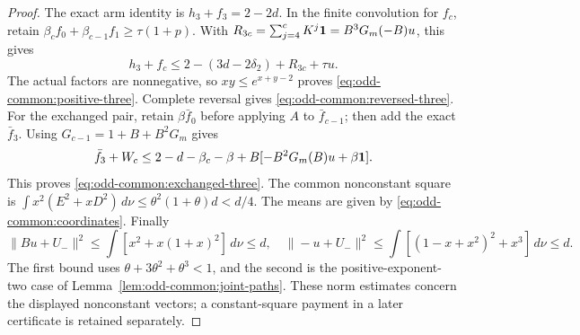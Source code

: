 \begin{proof}
The exact arm identity is \(h_3+f_3=2-2d\).
In the finite convolution for \(f_c\), retain
\(\beta_cf_0+\beta_{c-1}f_1\ge\tau(1+p)\).
With \(R_{3c}=\sum_{j=4}^cK^j\mathbf1=B^3G_m(-B)u\), this gives
\[
 h_3+f_c\le2-(3d-2\delta_2)+R_{3c}+\tau u.
\]
The actual factors are nonnegative, so \(xy\le e^{x+y-2}\) proves
\eqref{eq:odd-common:positive-three}. Complete reversal gives
\eqref{eq:odd-common:reversed-three}.
For the exchanged pair, retain \(\beta\bar f_0\) before applying
\(A\) to \(\bar f_{c-1}\); then add the exact \(\bar f_3\).
Using \(G_{c-1}=1+B+B^2G_m\) gives
\[
 \bar f_3+W_c\le2-d-\beta_c-\beta
                   +B[-B^2G_m(B)u+\beta\mathbf1].
\]
This proves \eqref{eq:odd-common:exchanged-three}.
The common nonconstant square is
\(\int x^2(E^2+xD^2)\,d\nu\le\theta^2(1+\theta)d<d/4\).
The means are given by \eqref{eq:odd-common:coordinates}.
Finally
\[
 \|Bu+U_-\|^2\le\int[x^2+x(1+x)^2]\,d\nu\le d,
\quad
 \|-u+U_-\|^2\le\int[(1-x+x^2)^2+x^3]\,d\nu\le d.
\]
The first bound uses \(\theta+3\theta^2+\theta^3<1\), and the
second is the positive-exponent-two case of
Lemma~\ref{lem:odd-common:joint-paths}. These norm estimates concern
the displayed nonconstant vectors; a constant-square payment in a
later certificate is retained separately.
\end{proof}
